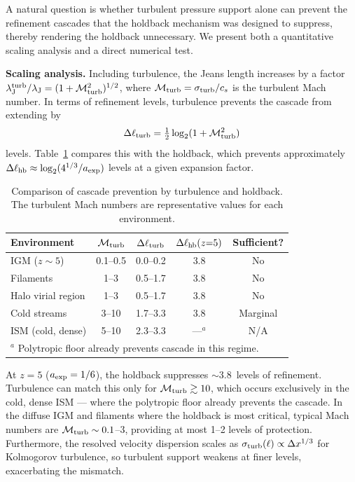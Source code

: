 \documentclass[fleqn,usenatbib]{mnras}
\newcommand{\lJ}{\lambda_{\rm J}}
\begin{document}
A natural question is whether turbulent pressure support alone can
prevent the refinement cascades that the holdback mechanism was
designed to suppress, thereby rendering the holdback unnecessary.
We present both a quantitative scaling analysis and a direct
numerical test.

\textbf{Scaling analysis.}
Including turbulence, the Jeans length increases by a factor
$\lJ^{\rm turb}/\lJ = (1 + \mathcal{M}_{\rm turb}^2)^{1/2}$,
where $\mathcal{M}_{\rm turb} = \sigma_{\rm turb}/c_s$ is the
turbulent Mach number.  In terms of refinement levels, turbulence
prevents the cascade from extending by
\begin{equation}
  \Delta\ell_{\rm turb} = \tfrac{1}{2}\log_2(1 + \mathcal{M}_{\rm turb}^2)
  \label{eq:turb_levels}
\end{equation}
levels.  Table~\ref{tab:turb_holdback} compares this with the
holdback, which prevents approximately
$\Delta\ell_{\rm hb} \approx \log_2(4^{1/3}/a_{\rm exp})$ levels at
a given expansion factor.

\begin{table}
\centering
\caption{Comparison of cascade prevention by turbulence and holdback.
The turbulent Mach numbers are representative values for each
environment.}
\label{tab:turb_holdback}
\begin{tabular}{lcccc}
\toprule
Environment & $\mathcal{M}_{\rm turb}$ & $\Delta\ell_{\rm turb}$ &
$\Delta\ell_{\rm hb}(z{=}5)$ & Sufficient? \\
\midrule
IGM ($z\sim5$)     & 0.1--0.5 & 0.0--0.2 & 3.8 & No \\
Filaments          & 1--3     & 0.5--1.7 & 3.8 & No \\
Halo virial region & 1--3     & 0.5--1.7 & 3.8 & No \\
Cold streams       & 3--10    & 1.7--3.3 & 3.8 & Marginal \\
ISM (cold, dense)  & 5--10    & 2.3--3.3 & ---$^a$ & N/A \\
\bottomrule
\multicolumn{5}{l}{\footnotesize $^a$ Polytropic floor already
prevents cascade in this regime.}
\end{tabular}
\end{table}

At $z = 5$ ($a_{\rm exp} = 1/6$), the holdback suppresses
$\sim$3.8~levels of refinement.  Turbulence can match this only
for $\mathcal{M}_{\rm turb} \gtrsim 10$, which occurs exclusively
in the cold, dense ISM --- where the polytropic floor already
prevents the cascade.  In the diffuse IGM and filaments where the
holdback is most critical, typical Mach numbers are
$\mathcal{M}_{\rm turb} \sim 0.1$--$3$, providing at most 1--2
levels of protection.  Furthermore, the resolved velocity
dispersion scales as $\sigma_{\rm turb}(\ell) \propto \Delta
x^{1/3}$ for Kolmogorov turbulence, so turbulent support weakens
at finer levels, exacerbating the mismatch.
\end{document}
